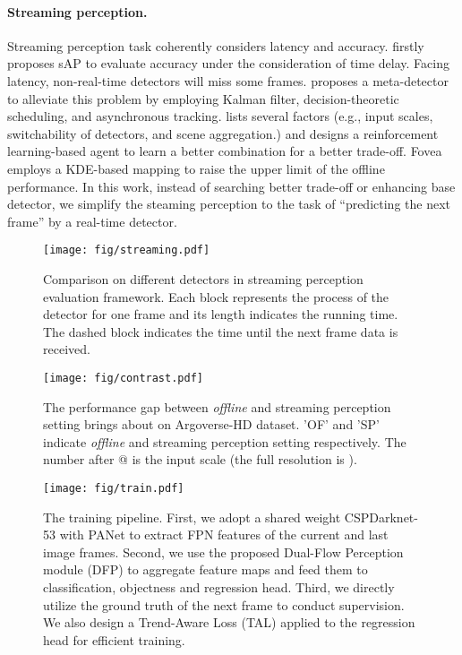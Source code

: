 \documentclass[10pt,twocolumn,letterpaper]{article}
\begin{document}
\paragraph{Streaming perception.} Streaming perception task coherently considers latency and accuracy. \cite{streamer} firstly proposes sAP to evaluate accuracy under the consideration of time delay. Facing latency, non-real-time detectors will miss some frames. \cite{streamer} proposes a meta-detector to alleviate this problem by employing Kalman filter\cite{kalman}, decision-theoretic scheduling, and asynchronous tracking\cite{tracker}. \cite{adaptivestreamer} lists several factors (e.g., input scales, switchability of detectors, and scene aggregation.) and designs a reinforcement learning-based agent to learn a better combination for a better trade-off. Fovea\cite{fovea} employs a KDE-based mapping to raise the upper limit of the offline performance. In this work, instead of searching better trade-off or enhancing base detector, we simplify the steaming perception to the task of ``predicting the next frame'' by a real-time detector. 





\begin{figure}[t]
\begin{center}
\texttt{[image: fig/streaming.pdf]}
\caption{Comparison on different detectors in streaming perception evaluation framework. Each block represents the process of the detector for one frame and its length indicates the running time. The dashed block indicates the time until the next frame data is received.}
\label{fig:streaming}
\end{center}
\end{figure}

\begin{figure}[b]
\begin{center}
\texttt{[image: fig/contrast.pdf]}
\caption{The performance gap between \emph{offline} and streaming perception setting brings about on Argoverse-HD dataset. 'OF' and 'SP' indicate \emph{offline} and streaming perception setting respectively. The number after @ is the input scale (the full resolution is ).}
\label{fig:contrast}
\end{center}
\end{figure}

\begin{figure*}
\setlength{\abovecaptionskip}{-3pt}
\begin{center}
\texttt{[image: fig/train.pdf]}
\end{center}
\caption{The training pipeline. First, we adopt a shared weight CSPDarknet-53 with PANet to extract FPN features of the current and last image frames. Second, we use the proposed Dual-Flow Perception module (DFP) to aggregate feature maps and feed them to classification, objectness and regression head. Third, we directly utilize the ground truth of the next frame to conduct supervision. We also design a Trend-Aware Loss (TAL) applied to the regression head for efficient training.}
\label{fig:train}
\end{figure*}
\end{document}
